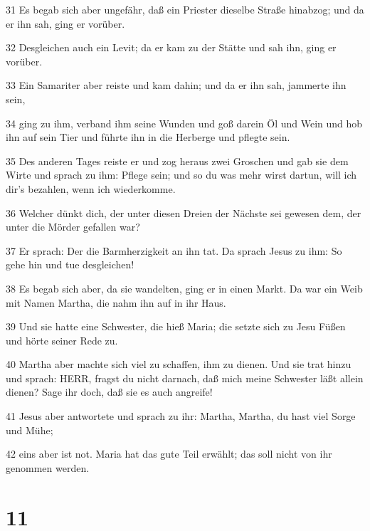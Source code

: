 \par 31 Es begab sich aber ungefähr, daß ein Priester dieselbe Straße hinabzog; und da er ihn sah, ging er vorüber.
\par 32 Desgleichen auch ein Levit; da er kam zu der Stätte und sah ihn, ging er vorüber.
\par 33 Ein Samariter aber reiste und kam dahin; und da er ihn sah, jammerte ihn sein,
\par 34 ging zu ihm, verband ihm seine Wunden und goß darein Öl und Wein und hob ihn auf sein Tier und führte ihn in die Herberge und pflegte sein.
\par 35 Des anderen Tages reiste er und zog heraus zwei Groschen und gab sie dem Wirte und sprach zu ihm: Pflege sein; und so du was mehr wirst dartun, will ich dir's bezahlen, wenn ich wiederkomme.
\par 36 Welcher dünkt dich, der unter diesen Dreien der Nächste sei gewesen dem, der unter die Mörder gefallen war?
\par 37 Er sprach: Der die Barmherzigkeit an ihn tat. Da sprach Jesus zu ihm: So gehe hin und tue desgleichen!
\par 38 Es begab sich aber, da sie wandelten, ging er in einen Markt. Da war ein Weib mit Namen Martha, die nahm ihn auf in ihr Haus.
\par 39 Und sie hatte eine Schwester, die hieß Maria; die setzte sich zu Jesu Füßen und hörte seiner Rede zu.
\par 40 Martha aber machte sich viel zu schaffen, ihm zu dienen. Und sie trat hinzu und sprach: HERR, fragst du nicht darnach, daß mich meine Schwester läßt allein dienen? Sage ihr doch, daß sie es auch angreife!
\par 41 Jesus aber antwortete und sprach zu ihr: Martha, Martha, du hast viel Sorge und Mühe;
\par 42 eins aber ist not. Maria hat das gute Teil erwählt; das soll nicht von ihr genommen werden.

\chapter{11}

